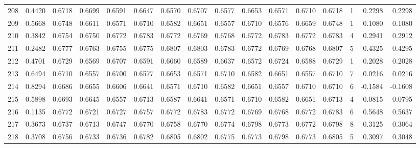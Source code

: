 \begin{tabular}{lrrrrrrrrrrrrrrr}
208 &      0.4420 &  0.6718 &  0.6699 &  0.6591 &  0.6647 &  0.6570 &  0.6707 &  0.6577 &  0.6653 &  0.6571 &   0.6710 &     0.6718 &      1 &                    0.2298 &                     0.2298 \\
209 &      0.5668 &  0.6748 &  0.6611 &  0.6571 &  0.6710 &  0.6582 &  0.6651 &  0.6557 &  0.6710 &  0.6576 &   0.6659 &     0.6748 &      1 &                    0.1080 &                     0.1080 \\
210 &      0.3842 &  0.6754 &  0.6750 &  0.6772 &  0.6783 &  0.6772 &  0.6769 &  0.6768 &  0.6772 &  0.6783 &   0.6772 &     0.6783 &      4 &                    0.2941 &                     0.2912 \\
211 &      0.2482 &  0.6777 &  0.6763 &  0.6755 &  0.6775 &  0.6807 &  0.6803 &  0.6783 &  0.6772 &  0.6769 &   0.6768 &     0.6807 &      5 &                    0.4325 &                     0.4295 \\
212 &      0.4701 &  0.6729 &  0.6569 &  0.6707 &  0.6591 &  0.6660 &  0.6589 &  0.6637 &  0.6572 &  0.6724 &   0.6588 &     0.6729 &      1 &                    0.2028 &                     0.2028 \\
213 &      0.6494 &  0.6710 &  0.6557 &  0.6700 &  0.6577 &  0.6653 &  0.6571 &  0.6710 &  0.6582 &  0.6651 &   0.6557 &     0.6710 &      7 &                    0.0216 &                     0.0216 \\
214 &      0.8294 &  0.6686 &  0.6655 &  0.6606 &  0.6641 &  0.6571 &  0.6710 &  0.6582 &  0.6651 &  0.6557 &   0.6710 &     0.6710 &      6 &                   -0.1584 &                    -0.1608 \\
215 &      0.5898 &  0.6693 &  0.6645 &  0.6557 &  0.6713 &  0.6587 &  0.6641 &  0.6571 &  0.6710 &  0.6582 &   0.6651 &     0.6713 &      4 &                    0.0815 &                     0.0795 \\
216 &      0.1135 &  0.6772 &  0.6721 &  0.6727 &  0.6757 &  0.6772 &  0.6783 &  0.6772 &  0.6769 &  0.6768 &   0.6772 &     0.6783 &      6 &                    0.5648 &                     0.5637 \\
217 &      0.3673 &  0.6737 &  0.6713 &  0.6747 &  0.6770 &  0.6758 &  0.6770 &  0.6774 &  0.6798 &  0.6773 &   0.6772 &     0.6798 &      8 &                    0.3125 &                     0.3064 \\
218 &      0.3708 &  0.6756 &  0.6733 &  0.6736 &  0.6782 &  0.6805 &  0.6802 &  0.6775 &  0.6773 &  0.6798 &   0.6773 &     0.6805 &      5 &                    0.3097 &                     0.3048 \\

\end{tabular}
